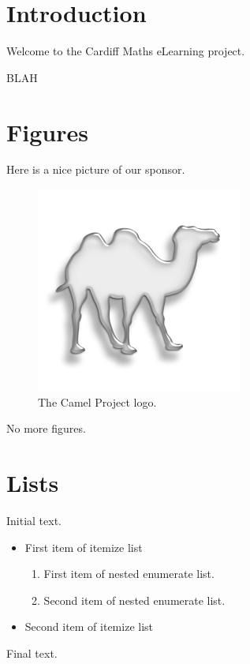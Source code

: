 \documentclass{camel}
\begin{document}
\makefrontmatter

\chapter{Introduction}\label{ch:intro}
Welcome to the Cardiff Maths eLearning project.

BLAH

\chapter{Figures}\label{ch:figures}
Here is a nice picture of our sponsor.

\begin{figure}[ht]
\centering
\includegraphics[scale=0.5]{camel_logo_reversed.png}
\caption{The Camel Project logo.}
\label{fig:camel-logo}
\end{figure}

No more figures.

\chapter{Lists}\label{ch:lists}

Initial text.
\begin{itemize}
\item First item of itemize list
\begin{enumerate}
\item First item of nested enumerate list.
\item Second item of nested enumerate list.
\end{enumerate}
\item Second item of itemize list
\end{itemize}
Final text.
\end{document}

